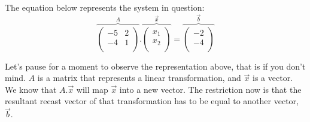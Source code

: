 \documentclass[600paper, 11pt,twoside,openany]{kdp}
\begin{document}
\indent The equation below represents the system in question:
\[ \overbrace{ \begin{pmatrix}
-5 & 2  \\
-4 & 1 \\
\end{pmatrix}}^A.\overbrace{\begin{pmatrix}
x_1 \\
x_2  \\
\end{pmatrix}}^{ \overrightarrow{x}} = \overbrace{\begin{pmatrix}
-2\\
-4 \\
\end{pmatrix}}^{\overrightarrow{b}} \]

\indent Let’s pause for a moment to observe the representation above, that is if you don’t mind. $A$ is a matrix that represents a linear transformation, and $\overrightarrow{x}$ is a vector. We know that $A.\overrightarrow{x}$ will map $\overrightarrow{x}$ into a new vector. The restriction now is that the resultant recast vector of that transformation has to be equal to another vector, $\overrightarrow{b}$.
\end{document}
